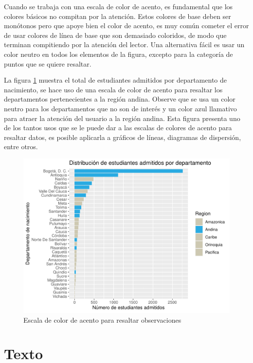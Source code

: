 \documentclass[
]{book}
\begin{document}
Cuando se trabaja con una escala de color de acento, es fundamental que los colores básicos no compitan por la atención. Estos colores de base deben ser monótonos pero que apoye bien el color de acento, es muy común cometer el error de usar colores de línea de base que son demasiado coloridos, de modo que terminan compitiendo por la atención del lector. Una alternativa fácil es usar un color neutro en todos los elementos de la figura, excepto para la categoría de puntos que se quiere resaltar.

La figura \ref{fig:resaltardatos-fig} muestra el total de estudiantes admitidos por departamento de nacimiento, se hace uso de una escala de color de acento para resaltar los departamentos pertenecientes a la región andina. Observe que se usa un color neutro para los departamentos que no son de interés y un color azul llamativo para atraer la atención del usuario a la región andina. Esta figura presenta uno de los tantos usos que se le puede dar a las escalas de colores de acento para resaltar datos, es posible aplicarla a gráficos de líneas, diagramas de dispersión, entre otros.

\begin{figure}

{\centering \includegraphics[width=0.8\linewidth]{Lineamientos-Visualizar_files/figure-latex/resaltardatos-fig-1} 

}

\caption{Escala de color de acento para resaltar observaciones}\label{fig:resaltardatos-fig}
\end{figure}

\hypertarget{texto}{%
\section{Texto}\label{texto}}
\end{document}
